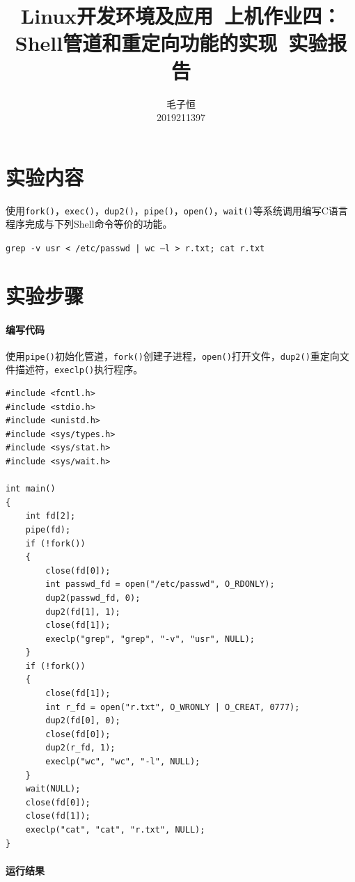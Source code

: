 \documentclass[lang=cn,11pt,a4paper,cite=authornum]{paper}
\title{Linux开发环境及应用\ 上机作业四：Shell管道和重定向功能的实现\ 实验报告}
\author{毛子恒 \\ 2019211397}
\institute{北京邮电大学\ 计算机学院}
\date{\zhtoday}
\begin{document}
\maketitle

\section{实验内容}

使用\texttt{fork()}，\texttt{exec()}，\texttt{dup2()}，\texttt{pipe()}，\texttt{open()}，\texttt{wait()}等系统调用编写C语言程序完成与下列Shell命令等价的功能。

\texttt{grep -v usr < /etc/passwd | wc –l > r.txt; cat r.txt}

\section{实验步骤}

\paragraph{编写代码}

使用\texttt{pipe()}初始化管道，\texttt{fork()}创建子进程，\texttt{open()}打开文件，\texttt{dup2()}重定向文件描述符，\texttt{execlp()}执行程序。

\begin{code}
\begin{verbatim}
#include <fcntl.h>
#include <stdio.h>
#include <unistd.h>
#include <sys/types.h>
#include <sys/stat.h>
#include <sys/wait.h>

int main()
{
    int fd[2];
    pipe(fd);
    if (!fork())
    {
        close(fd[0]);
        int passwd_fd = open("/etc/passwd", O_RDONLY);
        dup2(passwd_fd, 0);
        dup2(fd[1], 1);
        close(fd[1]);
        execlp("grep", "grep", "-v", "usr", NULL);
    }
    if (!fork())
    {
        close(fd[1]);
        int r_fd = open("r.txt", O_WRONLY | O_CREAT, 0777);
        dup2(fd[0], 0);
        close(fd[0]);
        dup2(r_fd, 1);
        execlp("wc", "wc", "-l", NULL);
    }
    wait(NULL);
    close(fd[0]);
    close(fd[1]);
    execlp("cat", "cat", "r.txt", NULL);
}
\end{verbatim}
\end{code}

\paragraph{运行结果}
\end{document}
